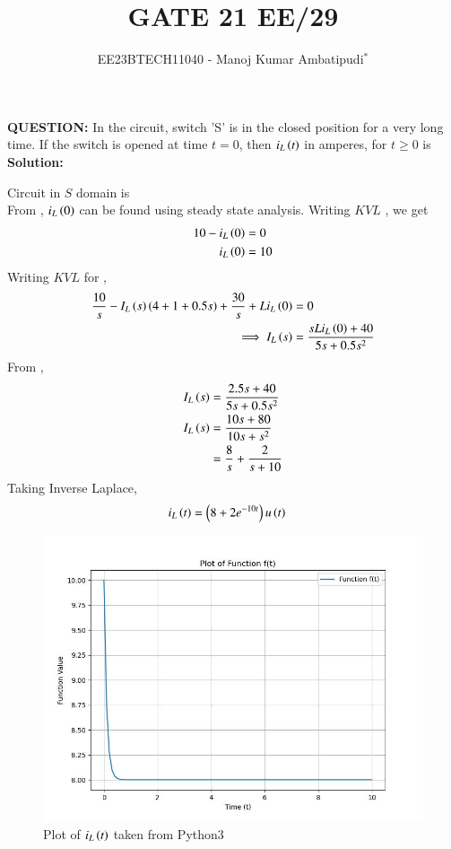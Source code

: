 \documentclass[journal,12pt,twocolumn]{IEEEtran}
\theoremstyle{remark}
\begin{document}

\vspace{3cm}
\title{GATE 21 EE/29}
\author{EE23BTECH11040 - Manoj Kumar Ambatipudi$^{*}$%
}
\maketitle
\newpage
\bigskip
\renewcommand{\thefigure}{\theenumi}
\renewcommand{\thetable}{\theenumi}
\textbf{QUESTION:}
In the circuit, switch 'S' is in the closed position for a very long time. If the switch is opened at time $t=0$, then $i_L\left(t\right)$ in amperes, for $t\geq0$ is
\\
\textbf{Solution:}

Circuit in $S$ domain is
\\
From , $i_L\left(0\right)$ can be found using steady state analysis. Writing $KVL$ , we get
\begin{align}
    10-i_L\left(0\right) &= 0\\
    i_L\left(0\right) &= 10\label{eq:EE_21_29_1}
\end{align}
Writing $KVL$ for ,
\begin{align}
    \frac{10}{s} - I_L\left(s\right)\left(4+1+0.5s\right) + \frac{30}{s} + Li_L\left(0\right) &= 0\\
    \implies I_L\left(s\right) &= \frac{sLi_L\left(0\right)+40}{5s + 0.5s^2} 
\end{align}
From , 
\begin{align}
    I_L\left(s\right) &= \frac{2.5s+40}{5s + 0.5s^2}\\
    I_L\left(s\right) &= \frac{10s+80}{10s + s^2}\\
                &= \frac{8}{s} + \frac{2}{s+10}
\end{align}
Taking Inverse Laplace, 
\begin{align}
    i_L\left(t\right) &= \left(8+2e^{-10t}\right)u\left(t\right)
\end{align}
\begin{figure}[h]
\renewcommand\thefigure{3}
    \centering
    \includegraphics[width=1.0\columnwidth]{figs/fig_3.jpg}
    \caption{Plot of $i_L\left(t\right)$ taken from Python3}
    \label{fig:EE_21_29_1}
\end{figure}
\end{document}
